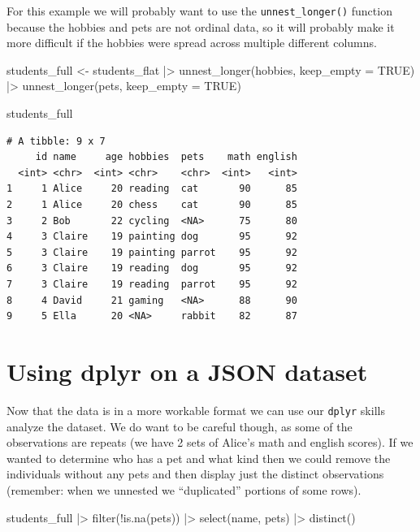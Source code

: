 \documentclass[
  letterpaper,
  DIV=11,
  numbers=noendperiod]{scrreprt}
\newenvironment{Shaded}{\begin{snugshade}}{\end{snugshade}}
\newcommand{\AttributeTok}[1]{\textcolor[rgb]{0.40,0.45,0.13}{#1}}
\newcommand{\ConstantTok}[1]{\textcolor[rgb]{0.56,0.35,0.01}{#1}}
\newcommand{\FunctionTok}[1]{\textcolor[rgb]{0.28,0.35,0.67}{#1}}
\newcommand{\NormalTok}[1]{\textcolor[rgb]{0.00,0.23,0.31}{#1}}
\newcommand{\OtherTok}[1]{\textcolor[rgb]{0.00,0.23,0.31}{#1}}
\newcommand{\SpecialCharTok}[1]{\textcolor[rgb]{0.37,0.37,0.37}{#1}}
\begin{document}
For this example we will probably want to use the
\texttt{unnest\_longer()} function because the hobbies and pets are not
ordinal data, so it will probably make it more difficult if the hobbies
were spread across multiple different columns.

\begin{Shaded}
\begin{Highlighting}[]
\NormalTok{students\_full }\OtherTok{\textless{}{-}}\NormalTok{ students\_flat }\SpecialCharTok{|\textgreater{}} 
  \FunctionTok{unnest\_longer}\NormalTok{(hobbies, }\AttributeTok{keep\_empty =} \ConstantTok{TRUE}\NormalTok{) }\SpecialCharTok{|\textgreater{}} 
  \FunctionTok{unnest\_longer}\NormalTok{(pets, }\AttributeTok{keep\_empty =} \ConstantTok{TRUE}\NormalTok{)}

\NormalTok{students\_full}
\end{Highlighting}
\end{Shaded}

\begin{verbatim}
# A tibble: 9 x 7
     id name     age hobbies  pets    math english
  <int> <chr>  <int> <chr>    <chr>  <int>   <int>
1     1 Alice     20 reading  cat       90      85
2     1 Alice     20 chess    cat       90      85
3     2 Bob       22 cycling  <NA>      75      80
4     3 Claire    19 painting dog       95      92
5     3 Claire    19 painting parrot    95      92
6     3 Claire    19 reading  dog       95      92
7     3 Claire    19 reading  parrot    95      92
8     4 David     21 gaming   <NA>      88      90
9     5 Ella      20 <NA>     rabbit    82      87
\end{verbatim}

\section{Using dplyr on a JSON
dataset}\label{using-dplyr-on-a-json-dataset}

Now that the data is in a more workable format we can use our
\texttt{dplyr} skills analyze the dataset. We do want to be careful
though, as some of the observations are repeats (we have 2 sets of
Alice's math and english scores). If we wanted to determine who has a
pet and what kind then we could remove the individuals without any pets
and then display just the distinct observations (remember: when we
unnested we ``duplicated'' portions of some rows).

\begin{Shaded}
\begin{Highlighting}[]
\NormalTok{students\_full }\SpecialCharTok{|\textgreater{}}
  \FunctionTok{filter}\NormalTok{(}\SpecialCharTok{!}\FunctionTok{is.na}\NormalTok{(pets)) }\SpecialCharTok{|\textgreater{}}
  \FunctionTok{select}\NormalTok{(name, pets) }\SpecialCharTok{|\textgreater{}}
  \FunctionTok{distinct}\NormalTok{()}
\end{Highlighting}
\end{Shaded}
\end{document}
